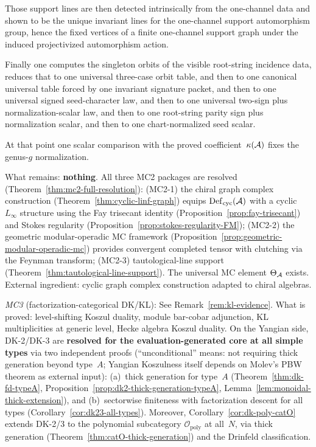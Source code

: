 \begin{remark}
Those support lines are then detected intrinsically from the one-channel
data and shown to be the unique invariant lines for the one-channel
support automorphism group, hence the fixed vertices of a finite
one-channel support graph under the induced projectivized automorphism
action.

Finally one computes the singleton orbits of the visible root-string
incidence data, reduces that to one universal three-case orbit table,
and then to one canonical universal table forced by one invariant
signature packet, and then to one universal signed seed-character law,
and then to one universal two-sign plus normalization-scalar law, and
then to one root-string parity sign plus normalization scalar, and then
to one chart-normalized seed scalar.

At that point one scalar comparison with the proved
coefficient~$\kappa(\mathcal{A})$ fixes the genus-$g$ normalization.

What remains: \textbf{nothing}.  All three MC2 packages are
resolved (Theorem~\ref{thm:mc2-full-resolution}):
\textup{(MC2-1)} the chiral graph complex construction
(Theorem~\ref{thm:cyclic-linf-graph}) equips $\operatorname{Def}_{\mathrm{cyc}}(\mathcal{A})$ with a
cyclic $L_\infty$ structure using the Fay trisecant identity
(Proposition~\ref{prop:fay-trisecant}) and Stokes regularity
(Proposition~\ref{prop:stokes-regularity-FM});
\textup{(MC2-2)} the geometric modular-operadic MC framework
(Proposition~\ref{prop:geometric-modular-operadic-mc}) provides
convergent completed tensor with clutching via the Feynman transform;
\textup{(MC2-3)} tautological-line support
(Theorem~\ref{thm:tautological-line-support}).
The universal MC element $\Theta_{\mathcal{A}}$ exists.
External ingredient: cyclic graph complex construction adapted to
chiral algebras.

\emph{MC3} (factorization-categorical DK/KL):
See Remark~\ref{rem:kl-evidence}.  What is proved: level-shifting
Koszul duality, module bar-cobar adjunction, KL multiplicities at
generic level, Hecke algebra Koszul duality.
On the Yangian side, DK-2/DK-3 are \textbf{resolved
for the evaluation-generated core at all simple types} via two
independent proofs (``unconditional'' means: not requiring thick
generation beyond type~$A$; Yangian Koszulness itself depends on
Molev's PBW theorem \cite{molev-yangians} as external input):
\textup{(a)}~thick generation for type~$A$
(Theorem~\ref{thm:dk-fd-typeA},
Proposition~\ref{prop:dk2-thick-generation-typeA},
Lemma~\ref{lem:monoidal-thick-extension}), and
\textup{(b)}~sectorwise finiteness with factorization descent for
all types (Corollary~\ref{cor:dk23-all-types}).
Moreover, Corollary~\ref{cor:dk-poly-catO} extends DK-2/3 to
the polynomial subcategory $\mathcal{O}_{\mathrm{poly}}$ at all~$N$,
via thick generation (Theorem~\ref{thm:catO-thick-generation})
and the Drinfeld classification.


\end{remark}
